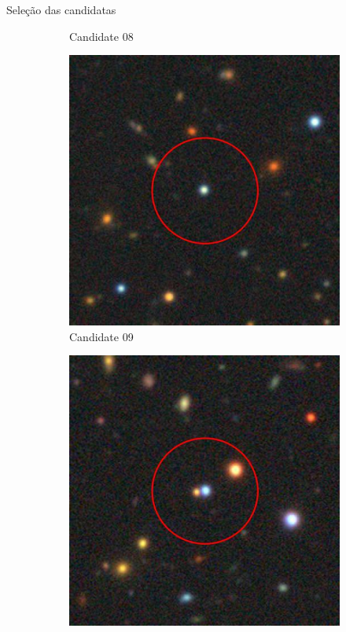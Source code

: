 \begin{frame}[c]{Seleção das candidatas}
\begin{figure}[]
\begin{subfigure}[b]{0.13\textwidth}
            \caption{Candidate 08}
        \end{subfigure}
        \begin{subfigure}[b]{0.13\textwidth}
            \includegraphics[width=\textwidth]{images/candidata_final/09.jpg}
            \caption{Candidate 09}
        \end{subfigure}
        \begin{subfigure}[b]{0.13\textwidth}
            \includegraphics[width=\textwidth]{images/candidata_final/10.jpg}

\end{subfigure}
\end{figure}
\end{frame}
